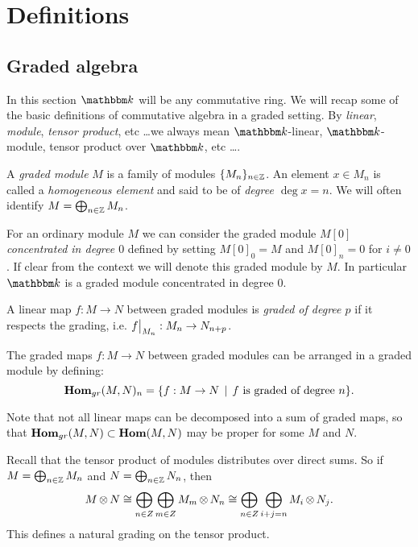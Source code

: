 \section{Definitions}
\label{sec:definitions}

\subsection{Graded algebra}

In this section $\k$ will be any commutative ring. We will recap some of the basic definitions of commutative algebra in a graded setting. By \emph{linear}, \emph{module}, \emph{tensor product}, etc \dots we always mean $\k$-linear, $\k$-module, tensor product over $\k$, etc \dots.

\begin{definition}
	A \emph{graded module} $M$ is a family of modules $\{M_n\}_{n\in\mathbb{Z}}$. An element $x \in M_n$ is called a \emph{homogeneous element} and said to be of \emph{degree $\deg{x} = n$}. We will often identify $M = \bigoplus_{n \in \mathbb{Z}} M_n$.
\end{definition}

For an ordinary module $M$ we can consider the graded module $M[0]$ \emph{concentrated in degree $0$} defined by setting $M[0]_0 = M$ and $M[0]_n = 0$ for $i \neq 0$. If clear from the context we will denote this graded module by $M$. In particular $\k$ is a graded module concentrated in degree $0$.

\begin{definition}
	A linear map $f: M \to N$ between graded modules is \emph{graded of degree $p$} if it respects the grading, i.e. $\restr{f}{M_n} : M_n \to N_{n+p}$.
\end{definition}

\begin{definition}
	The graded maps $f: M \to N$ between graded modules can be arranged in a graded module by defining:
	$$ \mathbf{Hom}_{gr}(M, N)_n = \{ f: M \to N \,\mid\, f \text{ is graded of degree } n \}. $$
\end{definition}

Note that not all linear maps can be decomposed into a sum of graded maps, so that $\mathbf{Hom}_{gr}(M, N) \subset \mathbf{Hom}(M, N)$ may be proper for some $M$ and $N$.

Recall that the tensor product of modules distributes over direct sums. So if $M = \bigoplus_{n \in \mathbb{Z}} M_n$ and $N = \bigoplus_{n \in \mathbb{Z}} N_n$, then
$$ M \operatorname*{\otimes} N \cong \bigoplus_{n \in Z} \bigoplus_{m \in Z} M_m \operatorname*{\otimes} N_n \cong \bigoplus_{n \in Z} \bigoplus_{i + j = n} M_i \operatorname*{\otimes} N_j. $$
This defines a natural grading on the tensor product.


